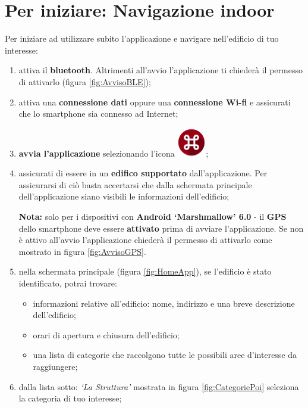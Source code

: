 \documentclass[../ClipsManualeUtente.tex]{subfiles}
\begin{document}
\section{Per iniziare: Navigazione indoor}
	Per iniziare ad utilizzare subito l'applicazione e navigare nell'edificio di tuo interesse:
	\begin{enumerate}
		\item attiva il \textbf{bluetooth}. Altrimenti all'avvio l'applicazione ti chiederà il permesso di attivarlo (figura \ref{fig:AvvisoBLE});
		\item attiva una \textbf{connessione dati} oppure una \textbf{connessione Wi-fi} e assicurati che lo smartphone sia connesso ad Internet;
		\item \textbf{avvia l'applicazione} selezionando l'icona \includegraphics[scale=0.4]{img/LogoApp};
		\item assicurati di essere in un \textbf{edifico supportato} dall'applicazione. Per assicurarsi di ciò basta accertarsi che dalla schermata principale dell'applicazione siano visibili le informazioni dell'edificio;
		
		\begin{framed}
			\textbf{Nota:} solo per i dispositivi con \textbf{Android `Marshmallow' 6.0} - il \textbf{GPS} dello smartphone deve essere \textbf{attivato} prima di avviare l'applicazione. Se non è attivo all'avvio l'applicazione chiederà il permesso di attivarlo come mostrato in figura \ref{fig:AvvisoGPS}.
		\end{framed}
		
		\item nella schermata principale (figura \ref{fig:HomeApp}), se l'edificio è stato identificato, potrai trovare:
		\begin{itemize}
			\item informazioni relative all'edificio: nome, indirizzo e una breve descrizione dell'edificio;
			\item orari di apertura e chiusura dell'edificio;
			\item una lista di categorie che raccolgono tutte le possibili aree d'interesse da raggiungere;
		\end{itemize}
		\item dalla lista sotto: \textit{`La Struttura'} mostrata in figura \ref{fig:CategoriePoi} seleziona la categoria di tuo interesse;
		

\end{enumerate}
\end{document}
